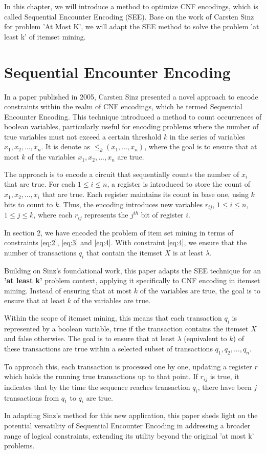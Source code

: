 In this chapter, we will introduce a method to optimize CNF encodings, which is called Sequential Encounter Encoding (SEE).
Base on the work of Carsten Sinz for problem 'At Most K',
we will adapt the SEE method to solve the problem 'at least k' of itemset mining.


\section{Sequential Encounter Encoding}

In a paper published in 2005, Carsten Sinz presented a novel approach to encode constraints within the realm of CNF encodings,
which he termed Sequential Encounter Encoding.
This technique introduced a method to count occurrences of boolean variables,
particularly useful for encoding problems where the number of true variables
must not exceed a certain threshold $k$ in the series of variables $x_1, x_2, ..., x_n$.
It is denote as $\le _k(x_1,...,x_n)$, where the goal is to ensure that at most $k$ of the variables $x_1, x_2,..., x_n$ are true.

The approach is to encode a circuit that sequentially counts the number of $x_i$ that are true.
For each $1 \le i \le n$, a register is introduced to store the count of $x_1, x_2,..., x_i$ that are true.
Each register maintains its count in base one, using $k$ bits to count to $k$.
Thus, the encoding introduces new variables $r_{ij}$, $1 \le i \le n$, $1 \le j \le k$, where each $r_{ij}$ represents the $j^{th}$ bit of register $i$.

In section 2, we have encoded the problem of item set mining in terms of constraints \ref{eq:2}, \ref{eq:3} and \ref{eq:4}.
With constraint \ref{eq:4}, we ensure that the number of transactions $q_i$ that contain the itemset $X$ is at least $\lambda$.

Building on Sinz's foundational work, this paper adapts the SEE technique
for an \textbf{'at least k'} problem context,
applying it specifically to CNF encoding in itemset mining.
Instead of ensuring that at most $k$ of the variables are true, the goal is to ensure that at least $k$ of the variables are true.

Within the scope of itemset mining, this means that each transaction $q_i$ is represented by a boolean variable,
true if the transaction contains the itemset $X$ and false otherwise.
The goal is to ensure that at least $\lambda$ (equivalent to $k$)
of these transactions are true within a selected subset of transactions $q_1, q_2,..., q_n$.

To approach this, each transaction is processed one by one, updating a register $r$ which holds the running true transactions up to that point.
If $r_{ij}$ is true, it indicates that by the time the sequence reaches transaction $q_i$, there have been $j$ transactions from $q_1$ to $q_i$ are true.

In adapting Sinz's method for this new application, this paper sheds light on the potential versatility of Sequential Encounter Encoding in addressing a broader range of logical constraints, extending its utility beyond the original 'at most k' problems.